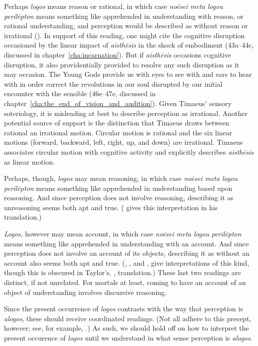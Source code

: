 Perhaps \emph{logos} means reason or rational, in which case \emph{noēsei meta logou perilēpton} means something like apprehended in understanding with reason, or rational understanding, and perception would be described as without reason or irrational (\citealt[87]{Archer-Hind:1888qd}). In support of this reading, one might cite the cognitive disruption occasioned by the linear impact of \emph{aisthēsis} in the shock of embodiment (43a--44c, discussed in chapter~\ref{cha:incarnation}). But if \emph{aisthēsis} occasions cognitive disruption, it also providentially provided to resolve any such disruption as it may occasion. The Young Gods provide us with eyes to see with and ears to hear with in order correct the revolutions in our soul disrupted by our initial encounter with the sensible (46e--47e, discussed in chapter~\ref{cha:the_end_of_vision_and_audition}). Given Timaeus' sensory soteriology, it is misleading at best to describe perception as irrational. Another potential source of support is the distinction that Timaeus draws between rational an irrational motion. Circular motion is rational and the six linear motions (forward, backward, left, right, up, and down) are irrational. Timaeus associates circular motion with cognitive activity and explicitly describes \emph{aisthēsis} as linear motion.

Perhaps, though, \emph{logos} may mean reasoning, in which case \emph{noēsei meta logou perilēpton} means something like apprehended in understanding based upon reasoning. And since perception does not involve reasoning, describing it as unreasoning seems both apt and true. (\citealt{Bury:1929jb} gives this interpretation in his translation.) 

\emph{Logos}, however may mean account, in which case \emph{noēsei meta logou perilēpton} means something like apprehended in understanding with an account. And since perception does not involve an account of its objects, describing it as without an account also seems both apt and true. (\citealt[61]{Taylor:1928qb}, \citealt[22]{Cornford:1935fk}, and \citealt[16]{Waterfield:2008lx}, give interpretations of this kind, though this is obscured in Taylor's, \citeyear[25]{Taylor:1929ov}, translation.) These last two readings are distinct, if not unrelated. For mortals at least, coming to have an account of an object of understanding involves discursive reasoning.

Since the present occurrence of \emph{logos} contrasts with the way that perception is \emph{alogos}, these should receive coordinated readings. (Not all adhere to this precept, however; see, for example, \citealt[13]{Zeyl:2000cs}.) As such, we should hold off on how to interpret the present occurence of \emph{logos} until we understand in what sense perception is \emph{alogos}.

